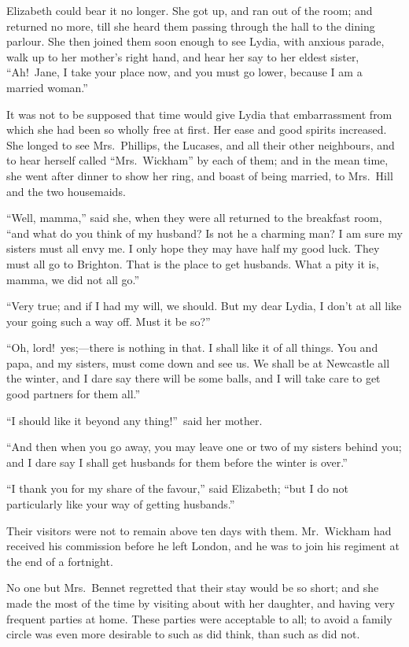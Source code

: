 \documentclass[12pt,english]{book}
\begin{document}
Elizabeth could bear it no longer. She got up, and ran out of the
room; and returned no more, till she heard them passing through the
hall to the dining parlour. She then joined them soon enough to see
Lydia, with anxious parade, walk up to her mother's right hand, and
hear her say to her eldest sister, {}``Ah!\ Jane, I take your place
now, and you must go lower, because I am a married woman.''

It was not to be supposed that time would give Lydia that embarrassment
from which she had been so wholly free at first. Her ease and good
spirits increased. She longed to see Mrs.\ Phillips, the Lucases,
and all their other neighbours, and to hear herself called {}``Mrs.\ Wickham''
by each of them; and in the mean time, she went after dinner to show
her ring, and boast of being married, to Mrs.\ Hill and the two housemaids.

{}``Well, mamma,'' said she, when they were all returned to the
breakfast room, {}``and what do you think of my husband? Is not he
a charming man? I am sure my sisters must all envy me. I only hope
they may have half my good luck. They must all go to Brighton. That
is the place to get husbands. What a pity it is, mamma, we did not
all go.''

{}``Very true; and if I had my will, we should. But my dear Lydia,
I don't at all like your going such a way off. Must it be so?''\ 

{}``Oh, lord!\ yes;\mbox{---}there is nothing in that. I shall
like it of all things. You and papa, and my sisters, must come down
and see us. We shall be at Newcastle all the winter, and I dare say
there will be some balls, and I will take care to get good partners
for them all.''

{}``I should like it beyond any thing!''\ said her mother.

{}``And then when you go away, you may leave one or two of my sisters
behind you; and I dare say I shall get husbands for them before the
winter is over.''

{}``I thank you for my share of the favour,'' said Elizabeth; {}``but
I do not particularly like your way of getting husbands.''

Their visitors were not to remain above ten days with them. Mr.\ Wickham
had received his commission before he left London, and he was to join
his regiment at the end of a fortnight.

No one but Mrs.\ Bennet regretted that their stay would be so short;
and she made the most of the time by visiting about with her daughter,
and having very frequent parties at home. These parties were acceptable
to all; to avoid a family circle was even more desirable to such as
did think, than such as did not.
\end{document}

